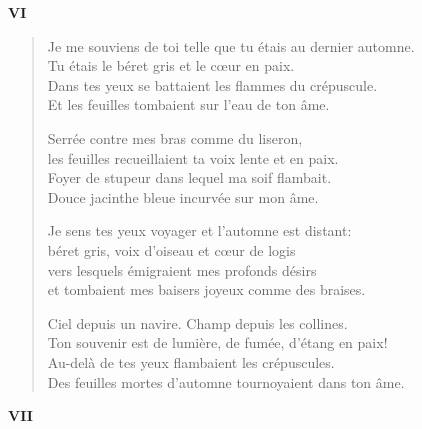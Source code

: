 \documentclass[11pt,a4paper]{book}
\begin{document}
\newpage


\begin{center} \textbf{VI} \end{center}

\bigskip

\begin{verse}
  Je me souviens de toi telle que tu étais au dernier automne. \\
  Tu étais le béret gris et le cœur en paix. \\
  Dans tes yeux se battaient les flammes du crépuscule. \\
  Et les feuilles tombaient sur l'eau de ton âme.

  Serrée contre mes bras comme du liseron, \\
  les feuilles recueillaient ta voix lente et en paix. \\
  Foyer de stupeur dans lequel ma soif flambait. \\
  Douce jacinthe bleue incurvée sur mon âme.

  Je sens tes yeux voyager et l'automne est distant: \\
  béret gris, voix d'oiseau et cœur de logis \\
  vers lesquels émigraient mes profonds désirs \\
  et tombaient mes baisers joyeux comme des braises.

  Ciel depuis un navire. Champ depuis les collines. \\
  Ton souvenir est de lumière, de fumée, d'étang en paix! \\
  Au-delà de tes yeux flambaient les crépuscules. \\
  Des feuilles mortes d'automne tournoyaient dans ton âme.
\end{verse}

\newpage


\begin{center} \textbf{VII} \end{center}

\bigskip
\end{document}
